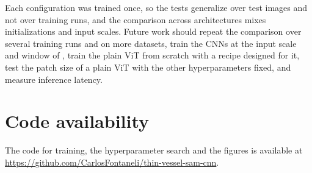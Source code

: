 Each configuration was trained once, so the tests generalize over test images and not over training runs, and the comparison across architectures mixes initializations and input scales. Future work should repeat the comparison over several training runs and on more datasets, train the CNNs at the input scale and window of \medsam{}, train the plain ViT from scratch with a recipe designed for it, test the patch size of a plain ViT with the other hyperparameters fixed, and measure inference latency.

\section*{Code availability}
The code for training, the hyperparameter search and the figures is available at \url{https://github.com/CarlosFontaneli/thin-vessel-sam-cnn}.
